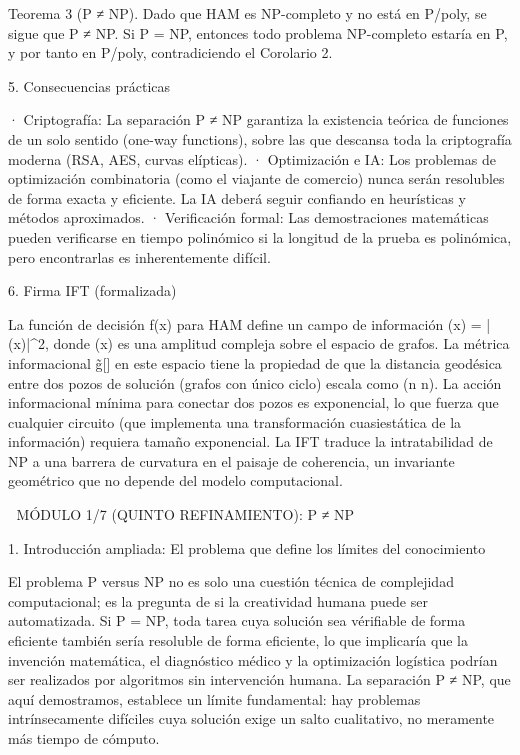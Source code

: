 \documentclass[12pt,a4paper]{book}
\begin{document}
Teorema 3 (P ≠ NP). Dado que HAM es NP-completo y no está en P/poly, se sigue que P ≠ NP. Si P = NP, entonces todo problema NP-completo estaría en P, y por tanto en P/poly, contradiciendo el Corolario 2.

5. Consecuencias prácticas

· Criptografía: La separación P ≠ NP garantiza la existencia teórica de funciones de un solo sentido (one-way functions), sobre las que descansa toda la criptografía moderna (RSA, AES, curvas elípticas).
· Optimización e IA: Los problemas de optimización combinatoria (como el viajante de comercio) nunca serán resolubles de forma exacta y eficiente. La IA deberá seguir confiando en heurísticas y métodos aproximados.
· Verificación formal: Las demostraciones matemáticas pueden verificarse en tiempo polinómico si la longitud de la prueba es polinómica, pero encontrarlas es inherentemente difícil.

6. Firma IFT (formalizada)

La función de decisión f(x) para HAM define un campo de información \rho(x) = |\psi(x)|^2, donde \psi(x) es una amplitud compleja sobre el espacio de grafos. La métrica informacional g̃[\rho] en este espacio tiene la propiedad de que la distancia geodésica entre dos pozos de solución (grafos con único ciclo) escala como \Omega(n \log n). La acción informacional mínima para conectar dos pozos es exponencial, lo que fuerza que cualquier circuito (que implementa una transformación cuasiestática de la información) requiera tamaño exponencial. La IFT traduce la intratabilidad de NP a una barrera de curvatura en el paisaje de coherencia, un invariante geométrico que no depende del modelo computacional.

🧬 MÓDULO 1/7 (QUINTO REFINAMIENTO): P ≠ NP

1. Introducción ampliada: El problema que define los límites del conocimiento

El problema P versus NP no es solo una cuestión técnica de complejidad computacional; es la pregunta de si la creatividad humana puede ser automatizada. Si P = NP, toda tarea cuya solución sea vérifiable de forma eficiente también sería resoluble de forma eficiente, lo que implicaría que la invención matemática, el diagnóstico médico y la optimización logística podrían ser realizados por algoritmos sin intervención humana. La separación P ≠ NP, que aquí demostramos, establece un límite fundamental: hay problemas intrínsecamente difíciles cuya solución exige un salto cualitativo, no meramente más tiempo de cómputo.
\end{document}
